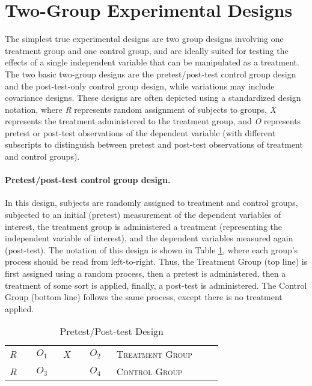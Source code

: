 \section{Two-Group Experimental Designs}

The simplest true experimental designs are two group designs involving one treatment group and one control group, and are ideally suited for testing the effects of a single independent variable that can be manipulated as a treatment. The two basic two-group designs are the pretest/post-test control group design and the post-test-only control group design, while variations may include covariance designs. These designs are often depicted using a standardized design notation, where \textit{R} represents random assignment of subjects to groups, \textit{X} represents the treatment administered to the treatment group, and \textit{O} represents pretest or post-test observations of the dependent variable (with different subscripts to distinguish between pretest and post-test observations of treatment and control groups).

\paragraph{Pretest/post-test control group design.} In this design, subjects are randomly assigned to treatment and control groups, subjected to an initial (pretest) measurement of the dependent variables of interest, the treatment group is administered a treatment (representing the independent variable of interest), and the dependent variables measured again (post-test). The notation of this design is shown in Table \ref{09:tab01}, where each group's process should be read from left-to-right. Thus, the Treatment Group (top line) is first assigned using a random process, then a pretest is administered, then a treatment of some sort is applied, finally, a post-test is administered. The Control Group (bottom line) follows the same process, except there is no treatment applied.

\begin{table}[H]
	\centering
	\begin{tabularx}{0.85\linewidth}{p{0.10\linewidth}p{0.10\linewidth}p{0.10\linewidth}p{0.10\linewidth}p{0.40\linewidth}}
		\toprule
		\textit{R} & $ O_1 $ & \textit{X} & $ O_2 $ & \textsc{Treatment Group} \\
		\textit{R} & $ O_3 $ &            & $ O_4 $ & \textsc{Control Group} \\
		\bottomrule
	\end{tabularx}
	\caption{Pretest/Post-test Design}
	\label{09:tab01}
\end{table}


